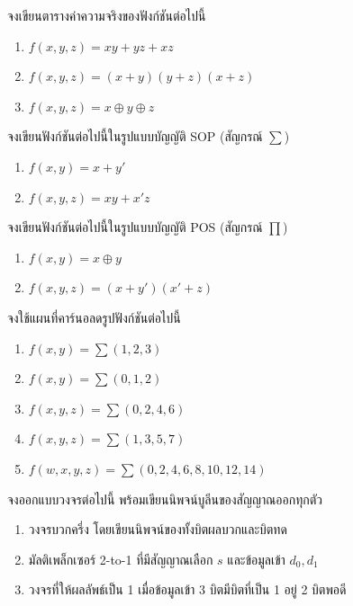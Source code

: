 \begin{exercise}
จงเขียนตารางค่าความจริงของฟังก์ชันต่อไปนี้
\begin{enumerate}
    \item $f(x, y, z) = x y + y z + x z$
    \item $f(x, y, z) = (x + y)(y + z)(x + z)$
    \item $f(x, y, z) = x \oplus y \oplus z$
\end{enumerate}
\end{exercise}

\begin{exercise}
จงเขียนฟังก์ชันต่อไปนี้ในรูปแบบบัญญัติ SOP (สัญกรณ์ $\sum$)
\begin{enumerate}
    \item $f(x, y) = x + y'$
    \item $f(x, y, z) = x y + x' z$
\end{enumerate}
\end{exercise}

\begin{exercise}
จงเขียนฟังก์ชันต่อไปนี้ในรูปแบบบัญญัติ POS (สัญกรณ์ $\prod$)
\begin{enumerate}
    \item $f(x, y) = x \oplus y$
    \item $f(x, y, z) = (x + y')(x' + z)$
\end{enumerate}
\end{exercise}

\begin{exercise}
จงใช้แผนที่คาร์นอลดรูปฟังก์ชันต่อไปนี้
\begin{enumerate}
    \item $f(x, y) = \sum(1, 2, 3)$
    \item $f(x, y) = \sum(0, 1, 2)$
    \item $f(x, y, z) = \sum(0, 2, 4, 6)$
    \item $f(x, y, z) = \sum(1, 3, 5, 7)$
    \item $f(w, x, y, z) = \sum(0, 2, 4, 6, 8, 10, 12, 14)$
\end{enumerate}
\end{exercise}

\begin{exercise}
จงออกแบบวงจรต่อไปนี้ พร้อมเขียนนิพจน์บูลีนของสัญญาณออกทุกตัว
\begin{enumerate}
    \item วงจรบวกครึ่ง โดยเขียนนิพจน์ของทั้งบิตผลบวกและบิตทด
    \item มัลติเพล็กเซอร์ 2-to-1 ที่มีสัญญาณเลือก $s$ และข้อมูลเข้า $d_0, d_1$
    \item วงจรที่ให้ผลลัพธ์เป็น 1 เมื่อข้อมูลเข้า 3 บิตมีบิตที่เป็น 1 อยู่ 2 บิตพอดี
\end{enumerate}
\end{exercise}

